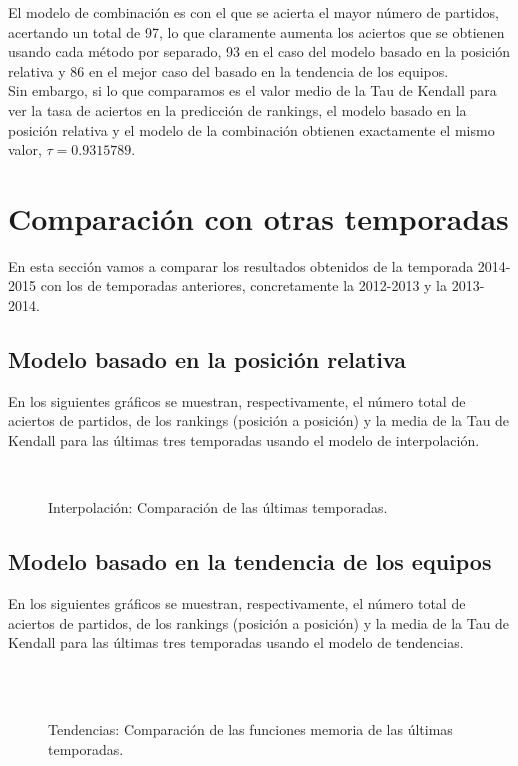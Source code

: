 El modelo de combinación es con el que se acierta el mayor número de partidos, acertando un total de 97, lo que claramente aumenta los aciertos que se obtienen usando cada método por separado, 93 en el caso del modelo basado en la posición relativa y 86 en el mejor caso del basado en la tendencia de los equipos. \\

Sin embargo, si lo que comparamos es el valor medio de la Tau de Kendall para ver la tasa de aciertos en la predicción de rankings, el modelo basado en la posición relativa y el modelo de la combinación obtienen exactamente el mismo valor, $\tau=0.9315789$.\\ 

\section{Comparación con otras temporadas}
En esta sección vamos a comparar los resultados obtenidos de la temporada 2014-2015 con los de temporadas anteriores, concretamente la 2012-2013 y la 2013-2014.

\subsection{Modelo basado en la posición relativa}
En los siguientes gráficos se muestran, respectivamente, el número total de aciertos de partidos, de los rankings (posición a posición) y la media de la Tau de Kendall para las últimas tres temporadas usando el modelo de interpolación.

\begin{figure}[H]
	\centering
	\\
	\caption{Interpolación: Comparación de las últimas temporadas.}
\end{figure}
\newpage
\subsection{Modelo basado en la tendencia de los equipos}
En los siguientes gráficos se muestran, respectivamente, el número total de aciertos de partidos, de los rankings (posición a posición) y la media de la Tau de Kendall para las últimas tres temporadas usando el modelo de tendencias.
\begin{figure}[H]
	\centering
	\\
	\\	
	\caption{Tendencias: Comparación de las funciones memoria de las últimas temporadas.}
\end{figure}

